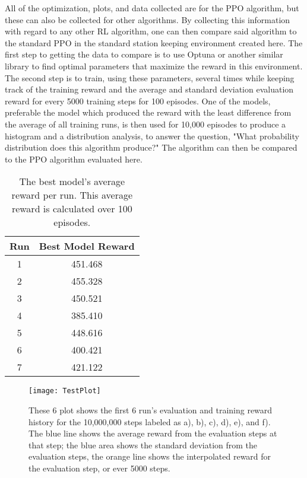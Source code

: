All of the optimization, plots, and data collected are for the PPO algorithm, but these can also be collected for other algorithms. By collecting this information with regard to any other RL algorithm, one can then compare said algorithm to the standard PPO in the standard station keeping environment created here. The first step to getting the data to compare is to use Optuna or another similar library to find optimal parameters that maximize the reward in this environment. The second step is to train, using these parameters, several times while keeping track of the training reward and the average and standard deviation evaluation reward for every 5000 training steps for 100 episodes. One of the models, preferable the model which produced the reward with the least difference from the average of all training runs, is then used for 10,000 episodes to produce a histogram and a distribution analysis, to answer the question, "What probability distribution does this algorithm produce?" The algorithm can then be compared to the PPO algorithm evaluated here.

\begin{table}
	\centering
	\begin{tabular}{|c|c|} \hline
		Run & Best Model Reward \\\hline\hline
		1 & 451.468 \\\hline
		2 & 455.328 \\\hline
		3 & 450.521 \\\hline
		4 & 385.410 \\\hline
		5 & 448.616 \\\hline
		6 & 400.421 \\\hline
		7 & 421.122 \\\hline
	\end{tabular}
	\caption{The best model's average reward per run. This average reward is calculated over 100 episodes.}
	\label{table:best_evaluation_rewards}
\end{table}

\begin{figure}
	\centering
	\texttt{[image: TestPlot]}
	\caption{These 6 plot shows the first 6 run's evaluation and training reward history for the 10,000,000 steps labeled as a), b), c), d), e), and f). The blue line shows the average reward from the evaluation steps at that step; the blue area shows the standard deviation from the evaluation steps, the orange line shows the interpolated reward for the evaluation step, or ever 5000 steps. }
	\label{fig:validation_runs}
\end{figure}


